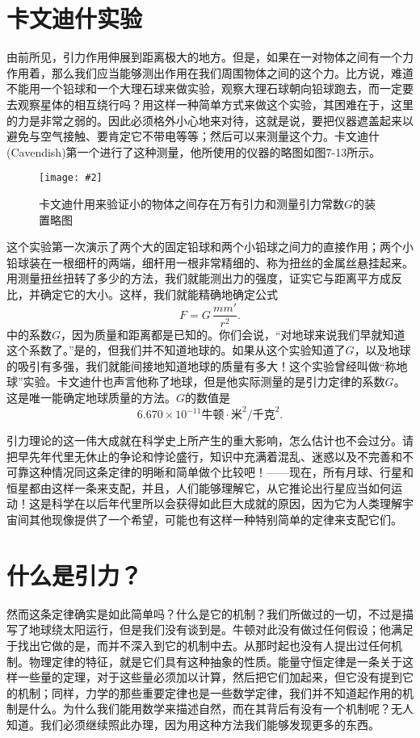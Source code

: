 \documentclass[12pt,oneside]{book}
\newenvironment{fig}[2][1]
{\begin{figure}[H]
\centering
\texttt{[image: \#2]}}
{\end{figure}}
\begin{document}
\section{卡文迪什实验}
由前所见，引力作用伸展到距离极大的地方。但是，如果在一对物体之间有一个力作用着，那么我们应当能够测出作用在我们周围物体之间的这个力。比方说，难道不能用一个铅球和一个大理石球来做实验，观察大理石球朝向铅球跑去，而一定要去观察星体的相互绕行吗？用这样一种简单方式来做这个实验，其困难在于，这里的力是非常之弱的。因此必须格外小心地来对待，这就是说，要把仪器遮盖起来以避免与空气接触、要肯定它不带电等等；然后可以来测量这个力。卡文迪什(Cavendish)第一个进行了这种测量，他所使用的仪器的略图如图7-13所示。
\begin{fig}{卡文迪什测量引力常数的装置}
\caption{卡文迪什用来验证小的物体之间存在万有引力和测量引力常数$G$的装置略图}
\label{fig:卡文迪什测量引力常数的装置}
\end{fig}
这个实验第一次演示了两个大的固定铅球和两个小铅球之间力的直接作用；两个小铅球装在一根细杆的两端，细杆用一根非常精细的、称为扭丝的金属丝悬挂起来。用测量扭丝扭转了多少的方法，我们就能测出力的强度，证实它与距离平方成反比，并确定它的大小。这样，我们就能精确地确定公式
\begin{equation*}
F=G\,\frac{mm'}{r^2}.
\end{equation*}
中的系数$G$，因为质量和距离都是已知的。你们会说，“对地球来说我们早就知道这个系数了。”是的，但我们并不知道地球的。如果从这个实验知道了$G$，以及地球的吸引有多强，我们就能间接地知道地球的质量有多大！这个实验曾经叫做“称地球”实验。卡文迪什也声言他称了地球，但是他实际测量的是引力定律的系数$G$。这是唯一能确定地球质量的方法。$G$的数值是
\begin{equation*}
6.670\times10^{-11}\text{牛顿}\cdot\text{米}^2/\text{千克}^2.
\end{equation*}

引力理论的这一伟大成就在科学史上所产生的重大影响，怎么估计也不会过分。请把早先年代里无休止的争论和悖论盛行，知识中充满着混乱、迷惑以及不完善和不可靠这种情况同这条定律的明晰和简单做个比较吧！——现在，所有月球、行星和恒星都由这样一条来支配，并且，人们能够理解它，从它推论出行星应当如何运动！这是科学在以后年代里所以会获得如此巨大成就的原因，因为它为人类理解宇宙间其他现像提供了一个希望，可能也有这样一种特别简单的定律来支配它们。


\section{什么是引力？}
然而这条定律确实是如此简单吗？什么是它的机制？我们所做过的一切，不过是描写了地球绕太阳运行，但是我们没有谈到是。牛顿对此没有做过任何假设；他满足于找出它做的是，而并不深入到它的机制中去。从那时起也没有人提出过任何机制。物理定律的特征，就是它们具有这种抽象的性质。能量守恒定律是一条关于这样一些量的定理，对于这些量必须加以计算，然后把它们加起来，但它没有提到它的机制；同样，力学的那些重要定律也是一些数学定律，我们并不知道起作用的机制是什么。为什么我们能用数学来描述自然，而在其背后有没有一个机制呢？无人知道。我们必须继续照此办理，因为用这种方法我们能够发现更多的东西。
\end{document}
